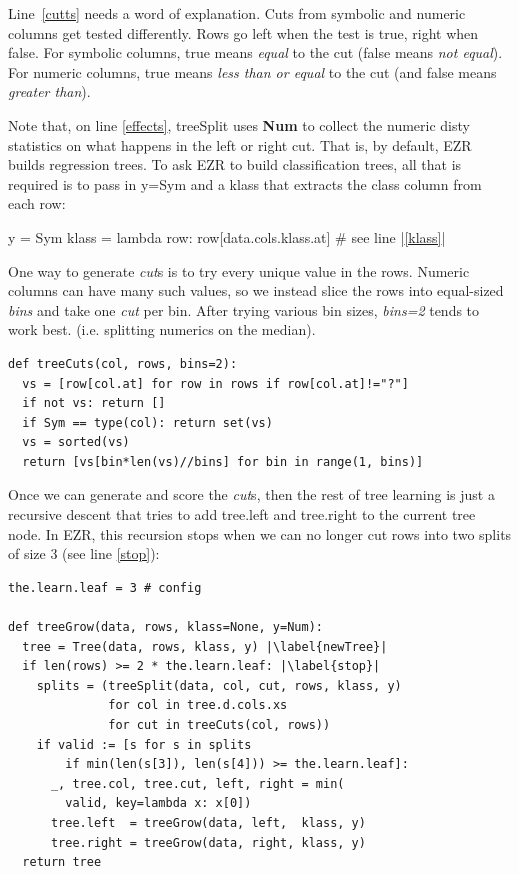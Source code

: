 \documentclass[AMA,STIX2COL]{WileyNJDv5}
\newcommand{\cls}[1]{%
  \setlength{\fboxsep}{1.5pt}%
  \colorbox{clsbg}{\sffamily\bfseries{#1}}%
}
\begin{document}
Line~\ref{cutts} needs a word of explanation.
Cuts from symbolic and numeric columns get tested differently. Rows go left when the test is true, right when false. For symbolic columns, true means {\em equal} to the cut (false means 
{\em not equal}). For numeric columns, true means {\em less than or equal} to the cut (and false means {\em greater than}).

Note that, on  line \ref{effects}, \textsf{treeSplit}   uses \cls{Num} to  
collect the numeric  \textsf{disty} statistics on what happens in the left or right cut. That is, by default, EZR builds regression trees.
To ask EZR to build classification
trees, all that is required is to pass in \textsf{y=Sym} and
a \textsf{klass} that extracts the class column from each row:
\begin{repl}
y = Sym
klass = lambda row: row[data.cols.klass.at] # see line |\ref{klass}|
\end{repl}
One way to generate {\em cut}s is to try every unique value in the rows. Numeric columns can have many such values, so we instead slice the rows into equal-sized 
{\em bins} and take one 
{\em cut} per bin. After trying  various bin sizes,
 {\em bins=2} tends to work best.
(i.e. splitting numerics on the median).
\begin{verbatim}
def treeCuts(col, rows, bins=2):
  vs = [row[col.at] for row in rows if row[col.at]!="?"]
  if not vs: return []
  if Sym == type(col): return set(vs)
  vs = sorted(vs)
  return [vs[bin*len(vs)//bins] for bin in range(1, bins)]
\end{verbatim}
Once we can generate and score the {\em cut}s, then the rest of tree learning is just
a recursive descent that tries to add \textsf{tree.left} and \textsf{tree.right} to the
current \textsf{tree} node.  In EZR, this recursion stops when
we can no longer cut rows into two splits of size 3 (see line \ref{stop}):
\begin{verbatim}
the.learn.leaf = 3 # config

def treeGrow(data, rows, klass=None, y=Num):
  tree = Tree(data, rows, klass, y) |\label{newTree}|
  if len(rows) >= 2 * the.learn.leaf: |\label{stop}|
    splits = (treeSplit(data, col, cut, rows, klass, y)
              for col in tree.d.cols.xs
              for cut in treeCuts(col, rows))
    if valid := [s for s in splits
        if min(len(s[3]), len(s[4])) >= the.learn.leaf]:
      _, tree.col, tree.cut, left, right = min(
        valid, key=lambda x: x[0])
      tree.left  = treeGrow(data, left,  klass, y)
      tree.right = treeGrow(data, right, klass, y)
  return tree
\end{verbatim}
\end{document}

